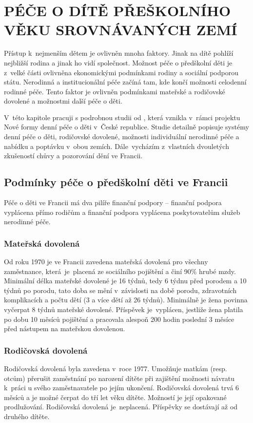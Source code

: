 \chapter{PÉČE O DÍTĚ PŘEŠKOLNÍHO VĚKU SROVNÁVANÝCH ZEMÍ}

	Přístup k nejmenším dětem je ovlivněn mnoha faktory. Jinak na dítě pohlíží nejbližší rodina a jinak ho vidí společnost. Možnost péče o předškolní děti je z velké části ovlivněna ekonomickými podmínkami rodiny a sociální podporou státu. Nerodinná a institucionální péče začíná tam, kde končí možnosti celodenní rodinné péče. Tento faktor je ovlivněn podmínkami mateřské a rodičovské dovolené a možnostmi další péče o děti.

	V této kapitole pracuji s podrobnou studii od \citet{DenniPece}, která vznikla v rámci projektu Nové formy denní péče o děti v České republice. Studie detailně popisuje systémy denní péče o děti, rodičovské dovolené, možnosti individuální nerodinné péče a nabídku a poptávku v obou zemích. Dále vycházím z vlastních dvouletých zkušeností chůvy a pozorování dění ve Francii.

		\section{Podmínky péče o předškolní děti ve Francii}
		Péče o děti ve Francii má dva pilíře finanční podpory – finanční podpora vyplácena přímo rodičům a finanční podpora vyplácena poskytovatelům služeb nerodinné péče. 

			\subsection{Mateřská dovolená}
				Od roku 1970 je ve Francii zavedena mateřská dovolená pro všechny zaměstnance, která je placená ze sociálního pojištění a činí 90\% hrubé mzdy. Minimální délka mateřské dovolené je 16 týdnů, tedy 6 týdnu před porodem a 10 týdnů po porodu, tato doba se mění v závislosti na době porodu, zdravotních komplikacích a počtu dětí (3 a více dětí až 26 týdnů). Minimálně je žena povinna vyčerpat 8 týdnů mateřské dovolené. Příspěvek je vyplácen, jestliže žena platila po dobu 10 měsíců pojištění a pracovala alespoň 200 hodin poslední 3 měsíce před nástupem na mateřskou dovolenou.

			\subsection{Rodičovská dovolená}
				Rodičovská dovolená byla zavedena v roce 1977. Umožňuje matkám (resp. otcům) přerušit zaměstnání po narození dítěte při zajištění možnosti návratu k práci u svého zaměstnavatele po jejím ukončení. Rodičovská dovolená trvá 6 měsíců a je možné čerpat do tří let věku dítěte. Možností je její opakované prodlužování. Rodičovská dovolená je neplacená. Příspěvky se dostávají až od druhého dítěte. 

